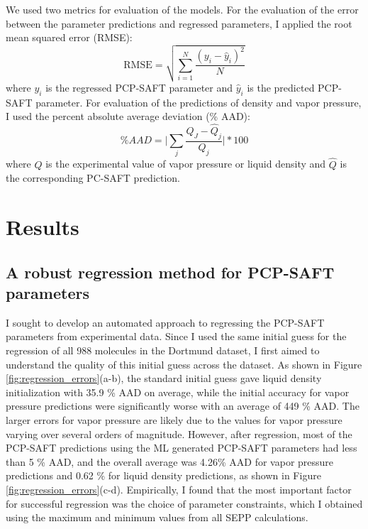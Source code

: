We used two metrics for evaluation of the models. For the evaluation of the error between the parameter predictions and regressed parameters, I applied the root mean squared error (RMSE):
\begin{equation}
    \text{RMSE} = \sqrt{\sum_{i=1}^N \frac{(y_i - \hat y_i)^2}{N}}
\end{equation}
where $y_i$ is the regressed PCP-SAFT parameter and $\hat y_i$ is the predicted PCP-SAFT parameter. For evaluation of the predictions of density and vapor pressure, I used the percent absolute average deviation (\% AAD):
\begin{equation}
    \% AAD = \biggl \vert \sum_j\frac{Q_J - \hat Q_j}{Q_j} \biggr \vert * 100
\end{equation}
where $Q$ is the experimental value of vapor pressure or liquid density and $\hat Q$ is the corresponding PC-SAFT prediction.

\section{Results}

\subsection{A robust regression method for PCP-SAFT parameters}

I sought to develop an automated approach to regressing the PCP-SAFT parameters from experimental data. Since I used the same initial guess for the regression of all 988 molecules in the Dortmund dataset, I first aimed to understand the quality of this initial guess across the dataset. As shown in Figure \ref{fig:regression_errors}(a-b), the standard initial guess gave liquid density initialization with 35.9 \% AAD on average, while the initial accuracy for vapor pressure predictions were significantly worse with an average of 449 \% AAD. The larger errors for vapor pressure are likely due to the values for vapor pressure varying over several orders of magnitude. However, after regression, most of the PCP-SAFT predictions using the ML generated PCP-SAFT parameters had less than 5 \% AAD, and the overall average was 4.26\% AAD for vapor pressure predictions and 0.62 \% for liquid density predictions, as shown in Figure \ref{fig:regression_errors}(c-d). Empirically, I found that the most important factor for successful regression was the choice of parameter constraints, which I obtained using the maximum and minimum values from all SEPP calculations.

